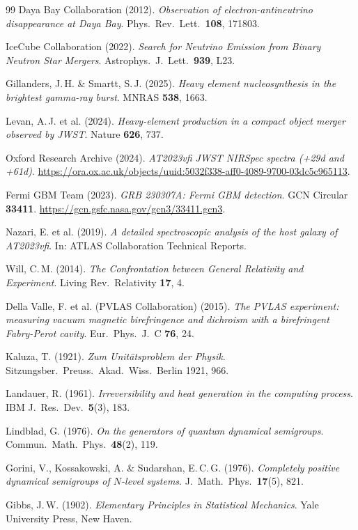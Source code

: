 \documentclass[12pt,a4paper,twoside]{article}
\begin{document}
\begin{thebibliography}{99}
Daya Bay Collaboration (2012).
\textit{Observation of electron-antineutrino disappearance at Daya Bay}.
Phys.\ Rev.\ Lett.\ \textbf{108}, 171803.

IceCube Collaboration (2022).
\textit{Search for Neutrino Emission from Binary Neutron Star Mergers}.
Astrophys.\ J.\ Lett.\ \textbf{939}, L23.

Gillanders, J.\,H. \& Smartt, S.\,J. (2025).
\textit{Heavy element nucleosynthesis in the brightest gamma-ray burst}.
MNRAS \textbf{538}, 1663.

Levan, A.\,J. et al. (2024).
\textit{Heavy-element production in a compact object merger observed by JWST}.
Nature \textbf{626}, 737.

Oxford Research Archive (2024).
\textit{AT2023vfi JWST NIRSpec spectra (+29d and +61d)}.
\url{https://ora.ox.ac.uk/objects/uuid:5032f338-aff0-4089-9700-03dc5c965113}.

Fermi GBM Team (2023).
\textit{GRB 230307A: Fermi GBM detection}.
GCN Circular \textbf{33411}. \url{https://gcn.gsfc.nasa.gov/gcn3/33411.gcn3}.

Nazari, E. et al. (2019).
\textit{A detailed spectroscopic analysis of the host galaxy of AT2023vfi}.
In: ATLAS Collaboration Technical Reports.

Will, C.\,M. (2014).
\textit{The Confrontation between General Relativity and Experiment}.
Living Rev.\ Relativity \textbf{17}, 4.

Della Valle, F. et al. (PVLAS Collaboration) (2015).
\textit{The PVLAS experiment: measuring vacuum magnetic birefringence and dichroism with a birefringent Fabry-Perot cavity}.
Eur.\ Phys.\ J.\ C \textbf{76}, 24.

Kaluza, T. (1921).
\textit{Zum Unit\"atsproblem der Physik}.
Sitzungsber.\ Preuss.\ Akad.\ Wiss.\ Berlin 1921, 966.

Landauer, R. (1961).
\textit{Irreversibility and heat generation in the computing process}.
IBM J.\ Res.\ Dev.\ \textbf{5}(3), 183.

Lindblad, G. (1976).
\textit{On the generators of quantum dynamical semigroups}.
Commun.\ Math.\ Phys.\ \textbf{48}(2), 119.

Gorini, V., Kossakowski, A. \& Sudarshan, E.\,C.\,G. (1976).
\textit{Completely positive dynamical semigroups of $N$-level systems}.
J.\ Math.\ Phys.\ \textbf{17}(5), 821.

Gibbs, J.\,W. (1902).
\textit{Elementary Principles in Statistical Mechanics}.
Yale University Press, New Haven.

\end{thebibliography}
\end{document}
